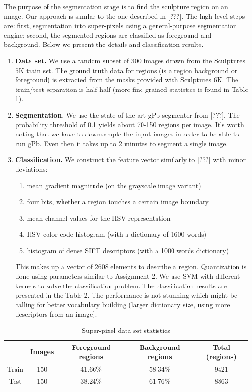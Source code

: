 \documentclass{article}
\begin{document}
The purpose of the segmentation stage is to find the sculpture region
on an image. Our approach is similar to the one described in {[}???{]}.
The high-level steps are: first, segmentation into super-pixels using
a general-purpose segmentation engine; second, the segmented regions
are classified as foreground and background. Below we present the
details and classification results.
\begin{enumerate}
\item \textbf{Data set. }We use a random subset of 300 images drawn from
the Sculptures 6K train set. The ground truth data for regions (is
a region background or foreground) is extracted from the masks provided
with Sculptures 6K. The train/test separation is half-half (more fine-grained
statistics is found in Table 1).
\item \textbf{Segmentation. }We use the state-of-the-art gPb segmentor from
{[}???{]}. The probability threshold of 0.1 yields about 70-150 regions
per image. It's worth noting that we have to downsample the input
images in order to be able to run gPb. Even then it takes up to 2
minutes to segment a single image.
\item \textbf{Classification. }We construct the feature vector similarly
to {[}???{]} with minor deviations:

\begin{enumerate}
\item mean gradient magnitude (on the grayscale image variant)
\item four bits, whether a region touches a certain image boundary
\item mean channel values for the HSV representation
\item HSV color code histogram (with a dictionary of 1600 words)
\item histogram of dense SIFT descriptors (with a 1000 words dictionary)
\end{enumerate}

This makes up a vector of 2608 elements to describe a region. Quantization
is done using parameters similar to Assignment 2. We use SVM with
different kernels to solve the classification problem. The classification
results are presented in the Table 2. The performance is not stunning
which might be calling for better vocabulary building (larger dictionary
size, using more descriptors from an image).

\end{enumerate}
\begin{table}
\caption{Super-pixel data set statistics}


\centering{}%
\begin{tabular}{|c|c|c|c|c|}
\hline 
 & Images & Foreground regions & Background regions & Total (regions)\tabularnewline
\hline 
\hline 
Train & 150 & 41.66\% & 58.34\% & 9421\tabularnewline
\hline 
Test & 150 & 38.24\% & 61.76\% & 8863\tabularnewline
\hline 
\end{tabular}
\end{table}
\end{document}
